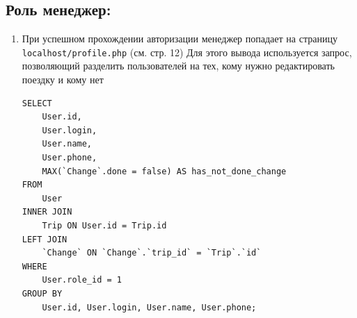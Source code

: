 \documentclass[a4paper,12pt]{article}
\begin{document}
\subsection{Роль менеджер:}
\begin{enumerate}
    \item При успешном прохождении авторизации менеджер попадает на страницу \\
          \texttt{localhost/profile.php} (см. стр. 12) Для этого вывода используется запрос, \\
          позволяющий разделить пользователей на тех, кому нужно редактировать поездку и кому нет \\

          \begin{lstlisting}[label={lst:sql-example}]
SELECT 
    User.id, 
    User.login, 
    User.name, 
    User.phone, 
    MAX(`Change`.done = false) AS has_not_done_change
FROM 
    User 
INNER JOIN 
    Trip ON User.id = Trip.id 
LEFT JOIN 
    `Change` ON `Change`.`trip_id` = `Trip`.`id` 
WHERE 
    User.role_id = 1
GROUP BY 
    User.id, User.login, User.name, User.phone;
    \end{lstlisting}


\end{enumerate}
\end{document}
